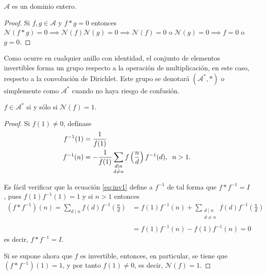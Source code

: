 \begin{theorem}
$\mathcal{A}$ es un dominio entero. 
\end{theorem}
\begin{proof}
Si $f,g \in \mathcal{A}$ y $f*g=0$ entonces $\mathcal{N}(f*g)=0 \implies \mathcal{N}(f)\mathcal{N}(g)=0 \implies \mathcal{N}(f)=0$ o $\mathcal{N}(g)=0 \implies f=0$ o $g=0$.
\end{proof}

\begin{remark}
Como ocurre en cualquier anillo con identidad, el conjunto de elementos invertibles forma un grupo respecto a la operación de multiplicación, en este caso, respecto a la convolución de Dirichlet. Este grupo se denotará $(\mathcal{A}^*,*)$ o simplemente como $\mathcal{A}^*$ cuando no haya riesgo de confusión.
\end{remark}

\begin{proposition}
$f \in \mathcal{A}^*$ si y sólo si $\mathcal{N}(f)=1$.
\end{proposition}
\begin{proof}
Si $f(1) \ne 0$, defínase
\begin{equation}\label{eq:inv1}
    \begin{split}
	f^{-1}(1) &= \frac{1}{f(1)} \\
	f^{-1}(n) &= -\frac{1}{f(1)} \sum_{\substack{d \mid n \\ d \ne n}} f \left( \frac{n}{d} \right) f^{-1}(d), \hspace{0.2cm} n>1.
\end{split}
\end{equation}

Es fácil verificar que la ecuación \eqref{eq:inv1} define a $f^{-1}$ de tal forma que $f*f^{-1} = I$, pues $f(1)f^{-1}(1)=1$ y si $n>1$ entonces
\begin{align*}
	(f*f^{-1})(n) = \sum_{d \mid n} f(d)f^{-1}\left( \frac{n}{d} \right) &= f(1)f^{-1}(n) + \sum_{\substack{d \mid n \\ d \ne n }} f(d)f^{-1}\left( \frac{n}{d} \right) \\
	&= f(1)f^{-1}(n)-f(1)f^{-1}(n) = 0
\end{align*}
es decir, $f*f^{-1}=I$.
\bigskip

Si se supone ahora que $f$ es invertible, entonces, en particular, se tiene que $(f*f^{-1})(1)=1$,  y por tanto $f(1) \ne 0$, es decir, $\mathcal{N}(f)=1$.
\end{proof}

